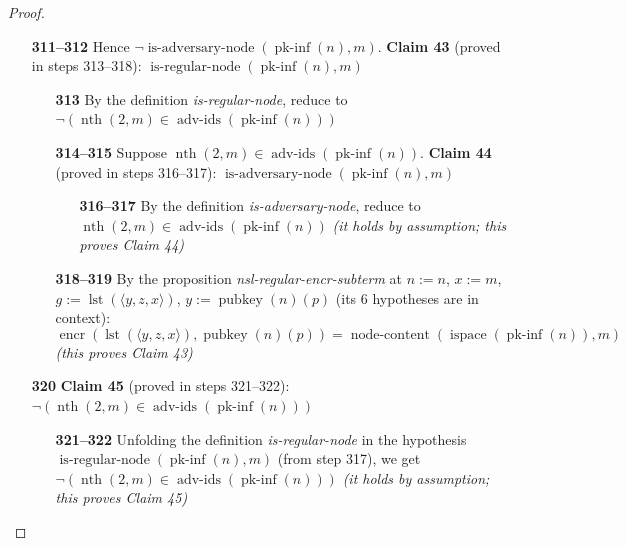 \documentclass[11pt]{article}
\theoremstyle{plain}
\begin{document}
\begin{proof}
\begin{itemize}[leftmargin=2.8em, itemsep=4pt, parsep=1pt]
\begin{itemize}[leftmargin=2.8em, itemsep=4pt, parsep=1pt]
  \item[\textbf{311--312}] Hence $\neg \operatorname{is\text{-}adversary\text{-}node}(\operatorname{pk\text{-}inf}(n), m)$. \textbf{Claim 43} (proved in steps 313--318): $\operatorname{is\text{-}regular\text{-}node}(\operatorname{pk\text{-}inf}(n), m)$
  \begin{itemize}[leftmargin=2.8em, itemsep=4pt, parsep=1pt]
  \item[\textbf{313}] By the definition \emph{is-regular-node}, reduce to $\neg (\operatorname{nth}(2, m) \in \operatorname{adv\text{-}ids}(\operatorname{pk\text{-}inf}(n)))$
  \item[\textbf{314--315}] Suppose $\operatorname{nth}(2, m) \in \operatorname{adv\text{-}ids}(\operatorname{pk\text{-}inf}(n))$. \textbf{Claim 44} (proved in steps 316--317): $\operatorname{is\text{-}adversary\text{-}node}(\operatorname{pk\text{-}inf}(n), m)$
  \begin{itemize}[leftmargin=2.8em, itemsep=4pt, parsep=1pt]
  \item[\textbf{316--317}] By the definition \emph{is-adversary-node}, reduce to $\operatorname{nth}(2, m) \in \operatorname{adv\text{-}ids}(\operatorname{pk\text{-}inf}(n))$  \emph{(it holds by assumption; this proves Claim 44)}
  \end{itemize}
  \item[\textbf{318--319}] By the proposition \emph{nsl-regular-encr-subterm} at $n := n$, $x := m$, $g := \operatorname{lst}(\langle y, z, x \rangle)$, $y := \operatorname{pubkey}(n)(p)$ (its 6 hypotheses are in context):
\begin{equation*}
\operatorname{encr}(\operatorname{lst}(\langle y, z, x \rangle), \operatorname{pubkey}(n)(p)) = \operatorname{node\text{-}content}(\operatorname{ispace}(\operatorname{pk\text{-}inf}(n)), m)
\end{equation*}
  \emph{(this proves Claim 43)}
  \end{itemize}
  \item[\textbf{320}] \textbf{Claim 45} (proved in steps 321--322): $\neg (\operatorname{nth}(2, m) \in \operatorname{adv\text{-}ids}(\operatorname{pk\text{-}inf}(n)))$
  \begin{itemize}[leftmargin=2.8em, itemsep=4pt, parsep=1pt]
  \item[\textbf{321--322}] Unfolding the definition \emph{is-regular-node} in the hypothesis $\operatorname{is\text{-}regular\text{-}node}(\operatorname{pk\text{-}inf}(n), m)$ (from step 317), we get $\neg (\operatorname{nth}(2, m) \in \operatorname{adv\text{-}ids}(\operatorname{pk\text{-}inf}(n)))$  \emph{(it holds by assumption; this proves Claim 45)}

\end{itemize}
\end{itemize}
\end{itemize}
\end{proof}
\end{document}
